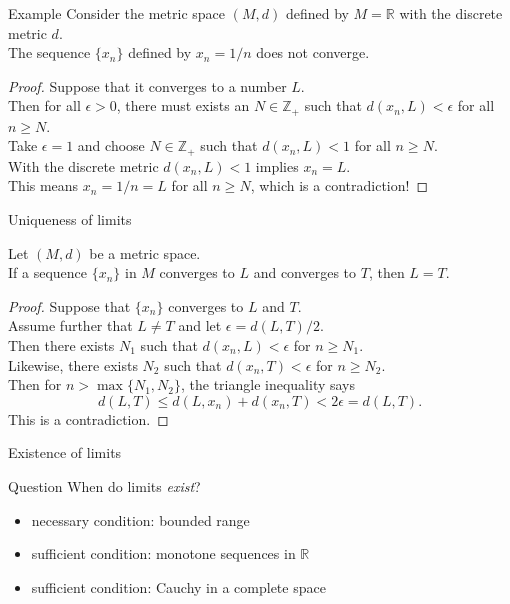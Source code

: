 \documentclass{beamer}
\begin{document}
\begin{frame}{Example}
Consider the metric space $(M,d)$ defined by $M=\mathbb{R}$ with the {\color{red} discrete} metric $d$.\\
\pause
The sequence $\{x_n\}$ defined by $x_n = 1/n$ does not converge.\\
\pause
\begin{proof}
\pause
Suppose that it converges to a number $L$.\\
\pause
Then for all $\epsilon > 0$, there must exists an $N\in\mathbb{Z}_+$ such that $d(x_n,L) < \epsilon$ for all $n\geq N$.\\
\pause
Take $\epsilon = 1$ and choose $N\in\mathbb{Z}_+$ such that $d(x_n,L) < 1$ for all $n\geq N$.\\
\pause
With the discrete metric $d(x_n,L) < 1$ implies $x_n = L$.\\
\pause
This means $x_n=1/n = L$ for all $n\geq N$, which is a contradiction!
\end{proof}
\end{frame}

\begin{frame}{Uniqueness of limits}
\begin{thm}
\pause
Let $(M,d)$ be a metric space.\\
\pause
If a sequence $\{x_n\}$ in $M$ converges to $L$ and converges to $T$, then $L=T$.
\end{thm}
\pause
\begin{proof}
\pause
Suppose that $\{x_n\}$ converges to $L$ and $T$.\\
\pause
Assume further that $L\neq T$ and let $\epsilon = d(L,T)/2$.\\
\pause
Then there exists $N_1$ such that $d(x_n,L) < \epsilon$ for $n \geq N_1$.\\
\pause
Likewise, there exists $N_2$ such that $d(x_n,T) < \epsilon$ for $n \geq N_2$.\\
\pause
Then for $n>\max\{N_1,N_2\}$,  the triangle inequality says
\pause
$$d(L,T) \leq d(L,x_n) + d(x_n,T) < 2\epsilon = d(L,T).$$
\pause
This is a contradiction.
\end{proof}
\end{frame}

\begin{frame}{Existence of limits}
  \begin{block}{Question}
    When do limits \emph{exist}?
  \end{block}
  \begin{itemize}
    \item necessary condition: bounded range
    \item sufficient condition: monotone sequences in $\mathbb R$
    \item sufficient condition: Cauchy in a complete space
  \end{itemize}
\end{frame}
\end{document}
